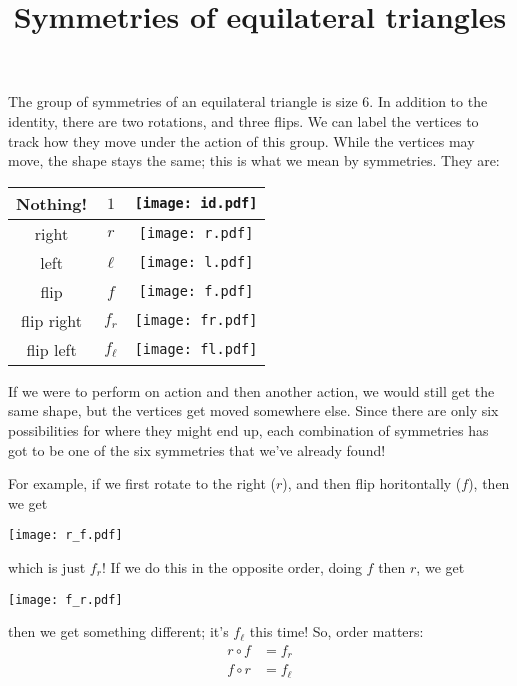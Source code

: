 \documentclass[12pt]{report}
\title{Symmetries of equilateral triangles}
\begin{document}
\thispagestyle{empty}

The group of symmetries of an equilateral triangle is size 6.  In
addition to the identity, there are two rotations, and three flips.
We can label the vertices to track how they move under the action of
this group.  While the vertices may move, the shape stays the same; this
is what we mean by symmetries.  They are:
\begin{figure*}
   \centering
   \begin{tabular}{|c|c|c|}
     \hline
     Nothing! & $1$ & \texttt{[image: id.pdf]}\\
     \hline
     right & $r$ & \texttt{[image: r.pdf]}\\
     \hline
     left & $\ell$ &\texttt{[image: l.pdf]}\\
     \hline
     flip & $f$ & \texttt{[image: f.pdf]}\\
     \hline
     flip right & $f_r$ &\texttt{[image: fr.pdf]}\\
     \hline
     flip left & $f_\ell$ & \texttt{[image: fl.pdf]}\\
     \hline
   \end{tabular}
\end{figure*}

If we were to perform on action and then another action, we would
still get the same shape, but the vertices get moved somewhere else.
Since there are only six possibilities for where they might end up,
each combination of symmetries has got to be one of the six symmetries
that we've already found!

For example, if we first rotate to the right ($r$), and then flip
horitontally ($f$), then we get
\begin{figure*}[h]
  \centering
   \texttt{[image: r\_f.pdf]}
\end{figure*}
which is just $f_r$!  If we do this in the opposite order, doing $f$
then $r$, we get
\begin{figure*}[h]
  \centering
   \texttt{[image: f\_r.pdf]}
\end{figure*}
then we get something different; it's $f_\ell$ this time!  So, order matters:
\begin{eqnarray*}
  r \circ f &= f_r\\
  f \circ r &= f_\ell\\
\end{eqnarray*}
\end{document}
